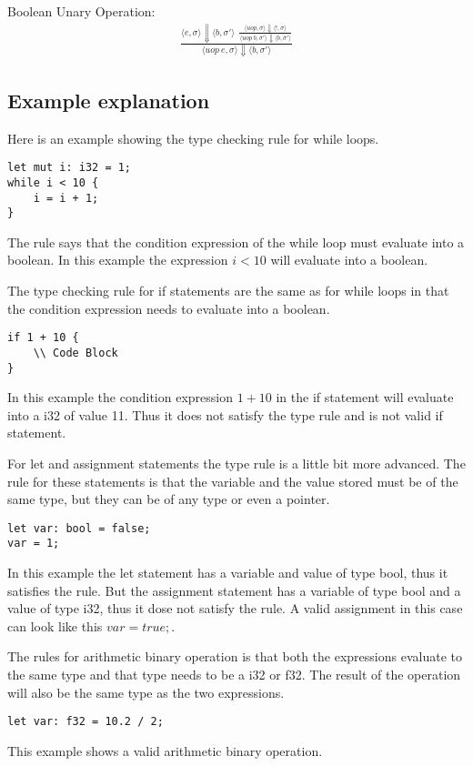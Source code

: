 \documentclass[12pt]{article}
\begin{document}
	Boolean Unary Operation:
	\begin{align*}
		\frac{
		\langle e, \sigma \rangle\Downarrow \langle b, \sigma' \rangle \ \ 
		\frac{
			\langle uop, \sigma \rangle\Downarrow \langle !, \sigma \rangle
		}{
			\langle uop\ b, \sigma' \rangle\Downarrow \langle b, \sigma' \rangle
		}}
		{\langle uop\ e, \sigma \rangle\Downarrow \langle b, \sigma' \rangle}
	\end{align*}


	\subsection{Example explanation}
	Here is an example showing the type checking rule for while loops.
    	\begin{verbatim}
let mut i: i32 = 1;
while i < 10 {
    i = i + 1;
}
    	\end{verbatim}
	The rule says that the condition expression of the while loop must evaluate into a boolean. In this example the expression $i < 10$ will evaluate into a boolean.

	The type checking rule for if statements are the same as for while loops in that the condition expression needs to evaluate into a boolean. 
    	\begin{verbatim}
if 1 + 10 {
    \\ Code Block
}
    	\end{verbatim}
	In this example the condition expression $1 + 10$ in the if statement will evaluate into a i32 of value 11. Thus it does not satisfy the type rule and is not valid if statement.

	For let and assignment statements the type rule is a little bit more advanced. The rule for these statements is that the variable and the value stored must be of the same type, but they can be of any type or even a pointer.
    	\begin{verbatim}
let var: bool = false;
var = 1;
    	\end{verbatim}
	In this example the let statement has a variable and value of type bool, thus it satisfies the rule. But the assignment statement has a variable of type bool and a value of type i32, thus it dose not satisfy the rule. A valid assignment in this case can look like this $var = true;$.


	The rules for arithmetic binary operation is that both the expressions evaluate to the same type and that type needs to be a i32 or f32. The result of the operation will also be the same type as the two expressions.
    	\begin{verbatim}
let var: f32 = 10.2 / 2;
    	\end{verbatim}
	This example shows a valid arithmetic binary operation.
\end{document}
